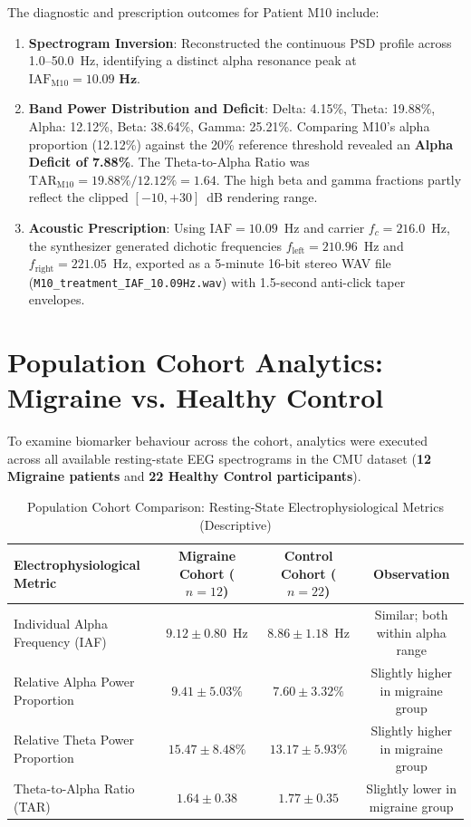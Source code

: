 \documentclass[12pt, a4paper]{report}
\begin{document}
The diagnostic and prescription outcomes for Patient M10 include:
\begin{enumerate}
    \item \textbf{Spectrogram Inversion}: Reconstructed the continuous PSD profile across 1.0--50.0~Hz, identifying a distinct alpha resonance peak at $\text{IAF}_{\text{M10}} = \mathbf{10.09\text{ Hz}}$.
    \item \textbf{Band Power Distribution and Deficit}: Delta: 4.15\%, Theta: 19.88\%, Alpha: 12.12\%, Beta: 38.64\%, Gamma: 25.21\%. Comparing M10's alpha proportion (12.12\%) against the 20\% reference threshold revealed an \textbf{Alpha Deficit of 7.88\%}. The Theta-to-Alpha Ratio was $\text{TAR}_{\text{M10}} = 19.88\% / 12.12\% = \mathbf{1.64}$. The high beta and gamma fractions partly reflect the clipped $[-10,+30]$~dB rendering range.
    \item \textbf{Acoustic Prescription}: Using $\text{IAF} = 10.09$~Hz and carrier $f_c = 216.0$~Hz, the synthesizer generated dichotic frequencies $f_{\text{left}} = 210.96$~Hz and $f_{\text{right}} = 221.05$~Hz, exported as a 5-minute 16-bit stereo WAV file (\texttt{M10\_treatment\_IAF\_10.09Hz.wav}) with 1.5-second anti-click taper envelopes.
\end{enumerate}

\section{Population Cohort Analytics: Migraine vs. Healthy Control}
\label{sec:cohort_analytics}
To examine biomarker behaviour across the cohort, analytics were executed across all available resting-state EEG spectrograms in the CMU dataset (\textbf{12 Migraine patients} and \textbf{22 Healthy Control participants}).

\begin{table}[htbp]
\centering
\caption{Population Cohort Comparison: Resting-State Electrophysiological Metrics (Descriptive)}
\label{tab:cohort_statistics}
\begin{tabular}{lccc}
\toprule
\textbf{Electrophysiological Metric} & \textbf{Migraine Cohort ($n=12$)} & \textbf{Control Cohort ($n=22$)} & \textbf{Observation} \\
\midrule
Individual Alpha Frequency (IAF) & $9.12 \pm 0.80$~Hz & $8.86 \pm 1.18$~Hz & Similar; both within alpha range \\
Relative Alpha Power Proportion & $9.41 \pm 5.03\%$ & $7.60 \pm 3.32\%$ & Slightly higher in migraine group \\
Relative Theta Power Proportion & $15.47 \pm 8.48\%$ & $13.17 \pm 5.93\%$ & Slightly higher in migraine group \\
Theta-to-Alpha Ratio (TAR) & $1.64 \pm 0.38$ & $1.77 \pm 0.35$ & Slightly lower in migraine group \\
\bottomrule
\end{tabular}
\end{table}
\end{document}
